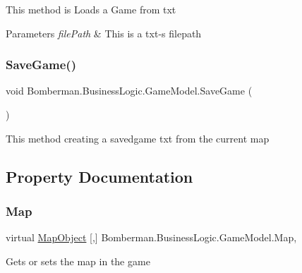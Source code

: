 This method is Loads a Game from txt 


\begin{DoxyParams}{Parameters}
{\em file\+Path} & This is a txt-\/s filepath \\
\hline
\end{DoxyParams}
\mbox{\label{class_bomberman_1_1_business_logic_1_1_game_model_a7a4737ede67178c084860b69b5feef15}} 
\subsubsection{\texorpdfstring{SaveGame()}{SaveGame()}}
{\footnotesize\ttfamily void Bomberman.\+Business\+Logic.\+Game\+Model.\+Save\+Game (\begin{DoxyParamCaption}{ }\end{DoxyParamCaption})\hspace{0.3cm}{\ttfamily [inline]}}



This method creating a savedgame txt from the current map 



\subsection{Property Documentation}
\mbox{\label{class_bomberman_1_1_business_logic_1_1_game_model_a2dab17c97f5ac55f447bf915ea67f4be}} 
\subsubsection{\texorpdfstring{Map}{Map}}
{\footnotesize\ttfamily virtual \mbox{\hyperlink{class_bomberman_1_1_model_1_1_map_object}{Map\+Object}} \mbox{[},\mbox{]} Bomberman.\+Business\+Logic.\+Game\+Model.\+Map\hspace{0.3cm}{\ttfamily [get]}, {\ttfamily [set]}}



Gets or sets the map in the game 

